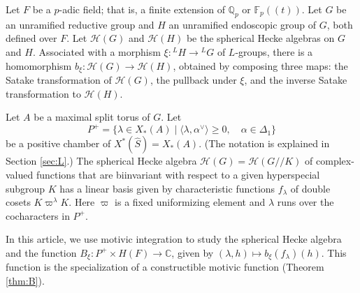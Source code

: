 
% 
% 


\newcommand{\ring}[1]{\mathbb{#1}}
\newcommand{\ang}[1]{\langle{#1}\rangle}
\def\op#1{{\operatorname{#1}}}

\def\Q{{\ring{Q}}}

\def\C{\mathcal C}
\def\N{\mathcal N}
\def\H{\mathcal H}
\def\T{\mathcal T}
\def\D{\mathcal D}

\def\n{{\mathfrak n}}
\def\g{{\mathfrak g}}
\def\t{{\mathfrak t}}
\def\h{{\mathfrak h}}

\def\inv{\op{inv}}
\def\dom{P^+}
\newcommand{\card}{\op{card}}
\def\Frob{\op{Frob}}
\def\dotw{\dot w}
\def\uu{\upsilon} %

\def\libel#1{{\text{\sc [#1]~}}\label{#1}}
\def\rif#1{(\ref{#1}-{\text{\sc #1})}}




Let $F$ be a $p$-adic field; that is, a finite extension of
$\ring{Q}_p$ or $\ring{F}_p((t))$.  Let $G$ be an unramified reductive
group and $H$ an unramified endoscopic group of $G$, both defined over
$F$.  Let $\H(G)$ and $\H(H)$ be the spherical Hecke algebras on $G$
and $H$.  Associated with a morphism $\xi:{}^LH\to {}^LG$ of
$L$-groups, there is a homomorphism $b_\xi:\H(G)\to \H(H)$, obtained
by composing three maps: the Satake transformation of $\H(G)$, the
pullback under $\xi$, and the inverse Satake transformation to
$\H(H)$.

Let $A$ be a maximal split torus of $G$.  Let 
\[
\dom = \{\lambda\in X_*(A) \mid \ang{\lambda,\alpha^\vee}\ge 0,
\quad \alpha\in \Delta_1\}
\]
be a positive chamber of $X^*(\hat S) = X_*(A)$.  (The notation
is explained in Section \ref{sec:L}.)   The spherical
Hecke algebra $\H(G)=\H(G//K)$ of complex-valued functions that are biinvariant with
respect to a given hyperspecial subgroup $K$ has a linear basis given
by characteristic functions $f_\lambda$ of double cosets
$K\varpi^\lambda K$.  Here $\varpi$ is a fixed uniformizing element
and $\lambda$ runs over the cocharacters in
$P^+$.

In this article, we use motivic integration to study the spherical
Hecke algebra and the function $B_\xi:P^+\times
H(F)\to \ring{C}$, given by $(\lambda,h)\mapsto b_\xi(f_\lambda)(h)$.
This function is the specialization of  a constructible motivic function
(Theorem \ref{thm:B}).


